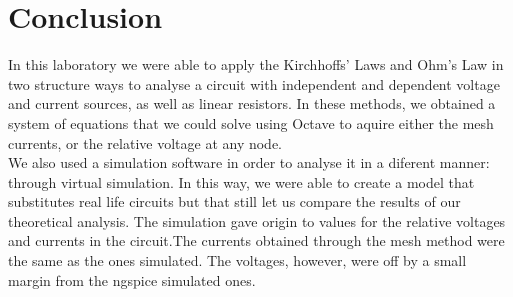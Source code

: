 \section{Conclusion}
In this laboratory we were able to apply the Kirchhoffs' Laws and Ohm's Law in two structure ways to analyse a circuit with independent and dependent voltage and current sources, as well as linear resistors. In these methods, we obtained a system of equations that we could solve using Octave to aquire either the mesh currents, or the relative voltage at any node.\\
 We also used a simulation software in order to analyse it in a diferent manner: through virtual simulation. In this way, we were able to create a model that substitutes real life circuits but that still let us compare the results of our theoretical analysis. The simulation gave origin to values for the relative voltages and currents in the circuit.The currents obtained through the mesh method were the same as the ones simulated. The voltages, however, were off by a small margin from the ngspice simulated ones.\\
